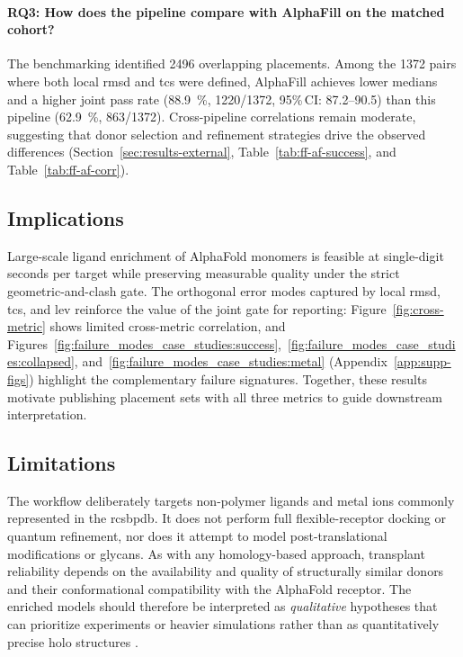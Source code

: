 \paragraph{RQ3: How does the pipeline compare with AlphaFill on the matched cohort?} The benchmarking identified \num{2496} overlapping placements. Among the \num{1372} pairs where both local \gls{rmsd} and \gls{tcs} were defined, AlphaFill achieves lower medians and a higher joint pass rate (\SI{88.9}{\percent}, \num{1220}/\num{1372}, 95\%\,CI: 87.2--90.5) than this pipeline (\SI{62.9}{\percent}, \num{863}/\num{1372}). Cross-pipeline correlations remain moderate, suggesting that donor selection and refinement strategies drive the observed differences (Section~\ref{sec:results-external}, Table~\ref{tab:ff-af-success}, and Table~\ref{tab:ff-af-corr}).

\subsection*{Implications}
Large-scale ligand enrichment of AlphaFold monomers is feasible at single-digit seconds per target while preserving measurable quality under the strict geometric-and-clash gate. The orthogonal error modes captured by local \gls{rmsd}, \gls{tcs}, and \gls{lev} reinforce the value of the joint gate for reporting: Figure~\ref{fig:cross-metric} shows limited cross-metric correlation, and Figures~\ref{fig:failure_modes_case_studies:success},~\ref{fig:failure_modes_case_studies:collapsed}, and~\ref{fig:failure_modes_case_studies:metal} (Appendix~\ref{app:supp-figs}) highlight the complementary failure signatures. Together, these results motivate publishing placement sets with all three metrics to guide downstream interpretation.

\subsection*{Limitations}
The workflow deliberately targets non-polymer ligands and metal ions commonly represented in the \gls{rcsbpdb}. It does not perform full flexible-receptor docking or quantum refinement, nor does it attempt to model post-translational modifications or glycans. As with any homology-based approach, transplant reliability depends on the availability and quality of structurally similar donors and their conformational compatibility with the AlphaFold receptor. The enriched models should therefore be interpreted as \emph{qualitative} hypotheses that can prioritize experiments or heavier simulations rather than as quantitatively precise holo structures \cite{hekkelmanAlphaFillEnrichingAlphaFold2023}.

